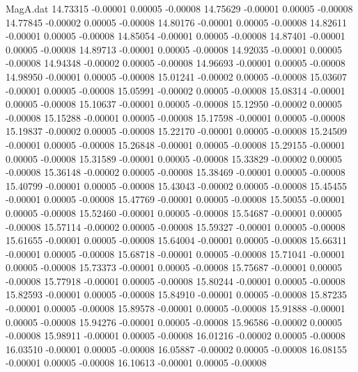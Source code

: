 \begin{filecontents}{MagA.dat}
  14.73315   -0.00001    0.00005   -0.00008
  14.75629   -0.00001    0.00005   -0.00008
  14.77845   -0.00002    0.00005   -0.00008
  14.80176   -0.00001    0.00005   -0.00008
  14.82611   -0.00001    0.00005   -0.00008
  14.85054   -0.00001    0.00005   -0.00008
  14.87401   -0.00001    0.00005   -0.00008
  14.89713   -0.00001    0.00005   -0.00008
  14.92035   -0.00001    0.00005   -0.00008
  14.94348   -0.00002    0.00005   -0.00008
  14.96693   -0.00001    0.00005   -0.00008
  14.98950   -0.00001    0.00005   -0.00008
  15.01241   -0.00002    0.00005   -0.00008
  15.03607   -0.00001    0.00005   -0.00008
  15.05991   -0.00002    0.00005   -0.00008
  15.08314   -0.00001    0.00005   -0.00008
  15.10637   -0.00001    0.00005   -0.00008
  15.12950   -0.00002    0.00005   -0.00008
  15.15288   -0.00001    0.00005   -0.00008
  15.17598   -0.00001    0.00005   -0.00008
  15.19837   -0.00002    0.00005   -0.00008
  15.22170   -0.00001    0.00005   -0.00008
  15.24509   -0.00001    0.00005   -0.00008
  15.26848   -0.00001    0.00005   -0.00008
  15.29155   -0.00001    0.00005   -0.00008
  15.31589   -0.00001    0.00005   -0.00008
  15.33829   -0.00002    0.00005   -0.00008
  15.36148   -0.00002    0.00005   -0.00008
  15.38469   -0.00001    0.00005   -0.00008
  15.40799   -0.00001    0.00005   -0.00008
  15.43043   -0.00002    0.00005   -0.00008
  15.45455   -0.00001    0.00005   -0.00008
  15.47769   -0.00001    0.00005   -0.00008
  15.50055   -0.00001    0.00005   -0.00008
  15.52460   -0.00001    0.00005   -0.00008
  15.54687   -0.00001    0.00005   -0.00008
  15.57114   -0.00002    0.00005   -0.00008
  15.59327   -0.00001    0.00005   -0.00008
  15.61655   -0.00001    0.00005   -0.00008
  15.64004   -0.00001    0.00005   -0.00008
  15.66311   -0.00001    0.00005   -0.00008
  15.68718   -0.00001    0.00005   -0.00008
  15.71041   -0.00001    0.00005   -0.00008
  15.73373   -0.00001    0.00005   -0.00008
  15.75687   -0.00001    0.00005   -0.00008
  15.77918   -0.00001    0.00005   -0.00008
  15.80244   -0.00001    0.00005   -0.00008
  15.82593   -0.00001    0.00005   -0.00008
  15.84910   -0.00001    0.00005   -0.00008
  15.87235   -0.00001    0.00005   -0.00008
  15.89578   -0.00001    0.00005   -0.00008
  15.91888   -0.00001    0.00005   -0.00008
  15.94276   -0.00001    0.00005   -0.00008
  15.96586   -0.00002    0.00005   -0.00008
  15.98911   -0.00001    0.00005   -0.00008
  16.01216   -0.00002    0.00005   -0.00008
  16.03510   -0.00001    0.00005   -0.00008
  16.05887   -0.00002    0.00005   -0.00008
  16.08155   -0.00001    0.00005   -0.00008
  16.10613   -0.00001    0.00005   -0.00008

\end{filecontents}
